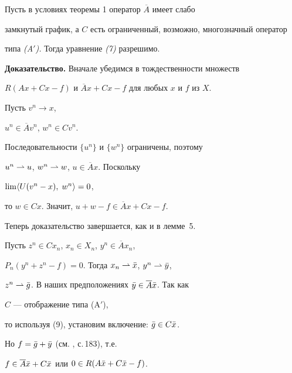  


\begin{thm} Пусть в условиях теоремы 1 оператор $\overline A$ имеет слабо 


замкнутый график, а $C$ есть ограниченный, возможно, многозначный оператор 


типа {\em (A$'$).} Тогда уравнение {\em (7)} разрешимо. 


\end{thm} 


\medskip


 


{\bf Доказательство.} Вначале убедимся в тождественности множеств 


$R(Ax+Cx-f)$ и $\overline Ax+Cx-f$ для любых $x$ и $f$ из $X$.


Пусть $v^n\to x$, 


$u^n\in\overline Av^n$, $w^n\in Cv^n$.


Последовательности $\{u^n\}$ и $\{w^n\}$ ограничены, поэтому 


$u^n\rightharpoonup u$, $w^n\rightharpoonup w$, $u\in\overline Ax$. Поскольку 


$\lim\langle U(v^n-x),\;w^n\rangle=0$, 


то $w\in Cx$. Значит, $u+w-f\in\overline Ax+Cx-f$. 


Теперь доказательство завершается, как и в лемме~5. 


 


Пусть $z^n\in Cx_n$, $x_n\in X_n$, $y^n\in\overline Ax_n$, 


$P_n(y^n+z^n-f)=0$. Тогда $x_n\rightharpoonup \Bar x$, $y^n\rightharpoonup \Bar y$, 


$z^n\rightharpoonup \Bar g$. В наших предположениях $\Bar y\in \overline A\Bar x$. Так как 


$C$ --- отображение типа (A$'$), 


то используя (9), установим включение: $\Bar g\in C\Bar x$. 


Но $f=\Bar g+\Bar y$ (см. \cite{Lio}, с.\,183), т.е. 


$f\in\overline A\Bar x+C\Bar x$ или $0\in R(A\Bar x+C\Bar x-f)$. 


 


